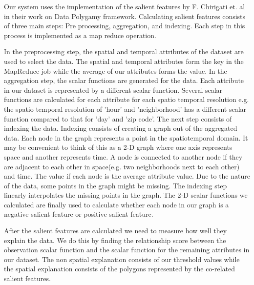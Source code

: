 Our system uses the implementation of the salient features by F. Chirigati et. al in their work on Data Polygamy framework. Calculating salient features consists of three main steps: Pre processing, aggregation, and indexing. Each step in this process is implemented as a map reduce operation.

In the preprocessing step, the spatial and temporal attributes of the dataset are used to select the data. The spatial and temporal attributes form the key in the MapReduce job while the average of our attributes forms the value. In the aggregation step, the scalar functions are generated for the data. Each attribute in our dataset is represented by a different scalar function. Several scalar functions are calculated for each attribute for each spatio temporal resolution e.g. the spatio temporal resolution of 'hour' and 'neighborhood' has a different scalar function compared to that for 'day' and 'zip code'. The next step consists of indexing the data. Indexing consists of creating a graph out of the aggregated data. Each node in the graph represents a point in the spatiotemporal domain. It may be convenient to think of this as a 2-D graph where one axis represents space and another represents time. A node is connected to another node if they are adjacent to each other in space(e.g. two neighborhoods next to each other) and time. The value if each node is the average attribute value. Due to the nature of the data, some points in the graph might be missing. The indexing step linearly interpolates the missing points in the graph. The 2-D scalar functions we calculated are finally used to calculate whether each node in our graph is a negative salient feature or positive salient feature.

After the salient features are calculated we need to measure how well they explain the data. We do this by finding the relationship score between the observation scalar function and the scalar function for the remaining attributes in our dataset. The non spatial explanation consists of our threshold values while the spatial explanation consists of the polygons represented by the co-related salient features.
